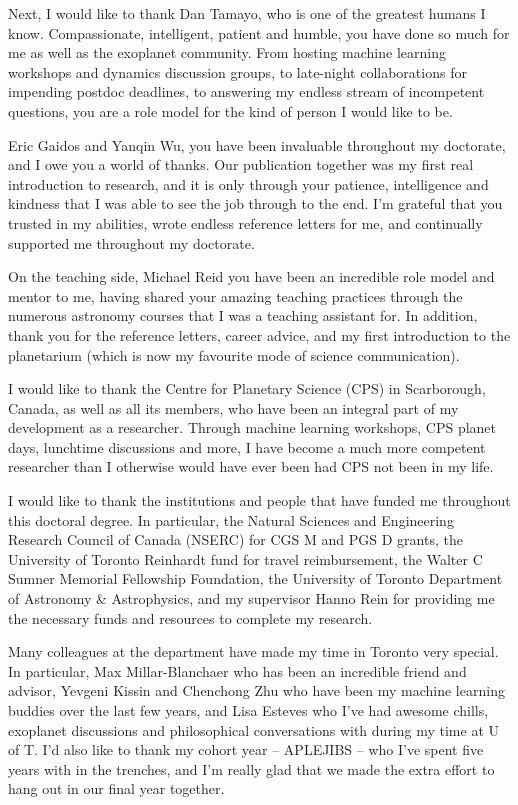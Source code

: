 \documentclass[letterpaper]{ut-thesis} %
\begin{document}
\begin{preliminary}
\begin{acknowledgements}
Next, I would like to thank Dan Tamayo, who is one of the greatest humans I know. 
Compassionate, intelligent, patient and humble, you have done so much for me as well as the exoplanet community. 
From hosting machine learning workshops and dynamics discussion groups, to late-night collaborations for impending postdoc deadlines, to answering my endless stream of incompetent questions, you are a role model for the kind of person I would like to be. 

Eric Gaidos and Yanqin Wu, you have been invaluable throughout my doctorate, and I owe you a world of thanks. 
Our publication together was my first real introduction to research, and it is only through your patience, intelligence and kindness that I was able to see the job through to the end. 
I'm grateful that you trusted in my abilities, wrote endless reference letters for me, and continually supported me throughout my doctorate.

On the teaching side, Michael Reid you have been an incredible role model and mentor to me, having shared your amazing teaching practices through the numerous astronomy courses that I was a teaching assistant for. 
In addition, thank you for the reference letters, career advice, and my first introduction to the planetarium (which is now my favourite mode of science communication).

I would like to thank the Centre for Planetary Science (CPS) in Scarborough, Canada, as well as all its members, who have been an integral part of my development as a researcher. 
Through machine learning workshops, CPS planet days, lunchtime discussions and more, I have become a much more competent researcher than I otherwise would have ever been had CPS not been in my life. 

I would like to thank the institutions and people that have funded me throughout this doctoral degree. 
In particular, the Natural Sciences and Engineering Research Council of Canada (NSERC) for CGS M and PGS D grants, the University of Toronto Reinhardt fund for travel reimbursement, the Walter C Sumner Memorial Fellowship Foundation, the University of Toronto Department of Astronomy \& Astrophysics, and my supervisor Hanno Rein for providing me the necessary funds and resources to complete my research. 

Many colleagues at the department have made my time in Toronto very special. 
In particular, Max Millar-Blanchaer who has been an incredible friend and advisor, Yevgeni Kissin and Chenchong Zhu who have been my machine learning buddies over the last few years, and Lisa Esteves who I've had awesome chills, exoplanet discussions and philosophical conversations with during my time at U of T.
I'd also like to thank my cohort year -- APLEJIBS -- who I've spent five years with in the trenches, and I'm really glad that we made the extra effort to hang out in our final year together. 


\end{acknowledgements}
\end{preliminary}
\end{document}
